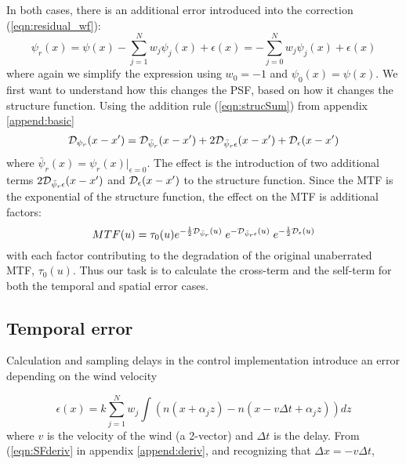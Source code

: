 \documentclass[11pt, oneside]{article}   	%
\begin{document}
In both cases, there is an additional error introduced into the correction (\ref{eqn:residual_wf}):
\begin{equation}
\label{eqn:residual_wf2}
\psi_r(x) = \psi(x) - \sum_{j=1}^{N} w_j \psi_j(x) + \epsilon(x) = -\sum_{j=0}^N w_j \psi_j(x) + \epsilon(x) 
\end{equation}
where again we simplify the expression using $w_0 = -1$ and $\psi_0(x) = \psi(x)$. We first want to understand how this changes the PSF, based on how it changes the structure function. Using the addition rule (\ref{eqn:strucSum}) from appendix \ref{append:basic}
\begin{equation}
\label{eqn:e55}
{\cal D}_{\psi_r} (x-x') = {\cal D}_{\bar \psi_r} (x-x')  + 2{\cal D}_{\bar \psi_r \epsilon} (x-x') + {\cal D}_{\epsilon} (x-x')
\end{equation}
where $\bar \psi_r(x) = \psi_r(x)|_{\epsilon=0}$.
The effect is the introduction of two additional terms $2{\cal D}_{\bar \psi_r \epsilon} (x-x')$ and ${\cal D}_{\epsilon} (x-x')$ to the structure function. Since the MTF is the exponential of the structure function, the effect on the MTF is additional factors:
\begin{equation}
\label{eqn:MTFfactors}
MTF(u) = \tau_0(u) e^{-\frac{1}{2}{\cal D}_{\bar \psi_r}(u)}\;  e^{-{\cal D}_{\bar \psi_r \epsilon} (u)} \; e^{-\frac{1}{2}{\cal D}_{\epsilon} (u)}
\end{equation}
with each factor contributing to the degradation of the original unaberrated MTF, $\tau_0(u)$. Thus our task is to calculate the cross-term and the self-term for both the temporal and spatial error cases. 

\subsection{Temporal error}

Calculation and sampling delays in the control implementation introduce an error depending on the wind velocity

\begin{equation}
\epsilon(x) = k \sum_{j=1}^N w_j \int  \left( n(x + \alpha_j z) - n(x-v \Delta t + \alpha_j z)\right) dz
\end{equation}
where $v$ is the velocity of the wind (a 2-vector) and $\Delta t$ is the delay. From (\ref{eqn:SFderiv} in appendix \ref{append:deriv}, and recognizing that $\Delta x = - v \Delta t$,
\end{document}
